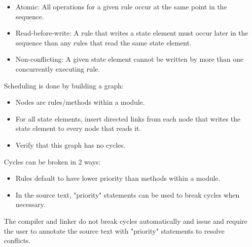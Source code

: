 \begin{itemize}
\item Atomic: All operations for a given rule occur at the same point in the sequence.
\item Read-before-write:  A rule that writes a state element must occur later in the sequence
than any rules that read the same state element.
\item Non-conflicting: A given state element cannot be written by more than one concurrently executing rule.
\end{itemize}

Scheduling is done by building a graph:
\begin{itemize}
\item Nodes are rules/methods within a module.
\item For all state elements, insert directed links from each node that writes the state element to every node that reads it.
\item Verify that this graph has no cycles.
\end{itemize}

Cycles can be broken in 2 ways:
\begin{itemize}
\item Rules default to have lower priority than methods within a module.
\item In the source text, "priority" statements can be used to break cycles when necessary.
\end{itemize}

The compiler and linker do not break cycles automatically and issue and require the user to annotate
the source text with "priority" statements to resolve conflicts.

